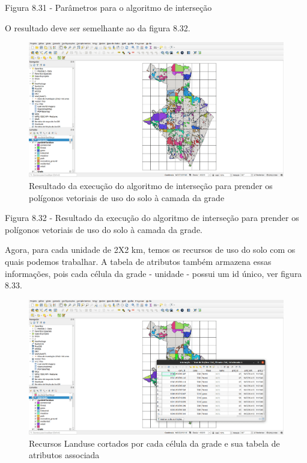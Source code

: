 \documentclass[
]{krantz}
\begin{document}
Figura 8.31 - Parâmetros para o algoritmo de interseção

O resultado deve ser semelhante ao da figura 8.32.

\begin{figure}
\centering
\includegraphics{media/modulo8/fig832.png}
\caption{Resultado da execução do algoritmo de interseção para prender os polígonos vetoriais de uso do solo à camada da grade}
\end{figure}

Figura 8.32 - Resultado da execução do algoritmo de interseção para prender os polígonos vetoriais de uso do solo à camada da grade.

Agora, para cada unidade de 2X2 km, temos os recursos de uso do solo com os quais podemos trabalhar. A tabela de atributos também armazena essas informações, pois cada célula da grade - unidade - possui um id único, ver figura 8.33.

\begin{figure}
\centering
\includegraphics{media/modulo8/fig833.png}
\caption{Recursos Landuse cortados por cada célula da grade e sua tabela de atributos associada}
\end{figure}
\end{document}
